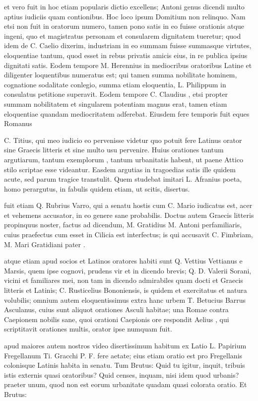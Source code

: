  et vero fuit in hoc etiam popularis dictio excellens; Antoni genus dicendi multo aptius iudiciis quam contionibus. Hoc loco ipsum Domitium non relinquo. Nam etsi non fuit in oratorum numero, tamen pono satis in eo fuisse orationis atque ingeni, quo et magistratus personam et consularem dignitatem tueretur; quod idem de C. Caelio dixerim, industriam in eo summam fuisse summasque virtutes, eloquentiae tantum, quod esset in rebus privatis amicis eius, in re publica ipsius dignitati satis. Eodem tempore M. Herennius in mediocribus oratoribus Latine et diligenter loquentibus numeratus est; qui tamen summa nobilitate hominem, cognatione sodalitate conlegio, summa etiam eloquentia, L. Philippum in consulatus petitione superavit. Eodem tempore C. Claudius , etsi propter summam nobilitatem et singularem potentiam magnus erat, tamen etiam eloquentiae quandam mediocritatem adferebat. Eiusdem fere temporis fuit eques Romanus

 C. Titius, qui meo iudicio eo pervenisse videtur quo potuit fere Latinus orator sine Graecis litteris et sine multo usu pervenire. Huius orationes tantum argutiarum, tantum exemplorum , tantum urbanitatis habent, ut paene Attico stilo scriptae esse videantur. Easdem argutias in tragoedias satis ille quidem acute, sed parum tragice transtulit. Quem studebat imitari L. Afranius poeta, homo perargutus, in fabulis quidem etiam, ut scitis, disertus.

 fuit etiam Q. Rubrius Varro, qui a senatu hostis cum C. Mario iudicatus est, acer et vehemens accusator, in eo genere sane probabilis. Doctus autem Graecis litteris propinquus noster, factus ad dicendum, M. Gratidius M. Antoni perfamiliaris, cuius praefectus cum esset in Cilicia est interfectus; is qui accusavit C. Fimbriam, M. Mari Gratidiani pater .

 atque etiam apud socios et Latinos oratores habiti sunt Q. Vettius Vettianus e Marsis, quem ipse cognovi, prudens vir et in dicendo brevis; Q. D. Valerii Sorani, vicini et familiares mei, non tam in dicendo admirabiles quam docti et Graecis litteris et Latinis; C. Rusticelius Bononiensis, is quidem et exercitatus et natura volubilis; omnium autem eloquentissimus extra hanc urbem T. Betucius Barrus Asculanus, cuius sunt aliquot orationes Asculi habitae; una Romae contra Caepionem nobilis sane, quoi orationi Caepionis ore respondit Aelius , qui scriptitavit orationes multis, orator ipse numquam fuit.

 apud maiores autem nostros video disertissimum habitum ex Latio L. Papirium Fregellanum Ti. Gracchi P. F. fere aetate; eius etiam oratio est pro Fregellanis colonisque Latinis habita in senatu. Tum Brutus: Quid tu igitur, inquit, tribuis istis externis quasi oratoribus? Quid censes, inquam, nisi idem quod urbanis? praeter unum, quod non est eorum urbanitate quadam quasi colorata oratio. Et Brutus:

